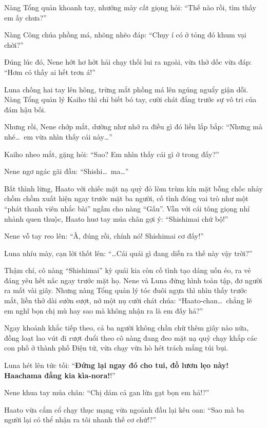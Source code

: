 \documentclass[../main.tex]{subfiles}
\begin{document}

Nàng Tổng quản khoanh tay, nhướng mày cất giọng hỏi: ``Thế nào rồi, tìm thấy em ấy chưa?''

Nàng Công chúa phồng má, nhõng nhẽo đáp: ``Chụy í có ở tỏng đó khum vại chời?''

Đúng lúc đó, Nene hớt hơ hớt hải chạy thối lui ra ngoài, vừa thở dốc vừa đáp: ``Hơm có thấy ai hết trơn á!''

Luna chống hai tay lên hông, trừng mắt phồng má lên ngúng nguẩy giận dỗi. Nàng Tổng quản lý Kaiho thì chỉ biết bó tay, cười chát đắng trước sự vô tri của đám hậu bối.

Nhưng rồi, Nene chớp mắt, dường như nhớ ra điều gì đó liền lắp bắp: ``Nhưng mà nhé\dots\ em vừa nhìn thấy cái này\dots''

Kaiho nheo mắt, gặng hỏi: ``Sao? Em nhìn thấy cái gì ở trong đấy?''

Nene ngơ ngác gãi đầu: ``Shishi\dots\ ma\dots''

Bất thình lừng, Haato với chiếc mặt nạ quỷ đỏ lòm trùm kín mặt bỗng chốc nhảy chồm chồm xuất hiện ngay trước mặt ba người, cố tình đóng vai trò như một ``phát thanh viên nhắc bài'' ngầm cho nàng ``Gấu''. Vẫn với cái tông giọng nhí nhảnh quen thuộc, Haato huơ tay múa chân gợi ý: ``Shishimai chứ bộ!''


Nene vỗ tay reo lên: ``À, đúng rồi, chính nó! Shishimai cơ đấy!''

Luna nhíu mày, cạn lời thốt lên: ``\dots Cái quái gì đang diễn ra thế này vậy trời?''

Thậm chí, cô nàng ``Shishimai'' kỳ quái kia còn cố tình tạo dáng uốn éo, ra vẻ đáng yêu hết nấc ngay trước mặt họ. Nene và Luna đứng hình toàn tập, đơ người ra mất vài giây. Nhưng nàng Tổng quản lý tóc đuôi ngựa thì nhìn thấy trước mắt, liền thở dài sườn sượt, nở một nụ cười chát chúa: ``Haato-chan\dots\ chẳng lẽ em nghĩ bọn chị mù hay sao mà không nhận ra là em đấy hả?''

Ngay khoảnh khắc tiếp theo, cả ba người không chần chừ thêm giây nào nữa, đồng loạt lao vút đi rượt đuổi theo cô nàng đang đeo mặt nạ quỷ chạy khắp các con phố ở thành phố Điện tử, vừa chạy vừa hò hét trách mắng túi bụi.

Luna hét lên tức tối: ``\textbf{Đứng lại ngay đó cho tui, đồ lươn lẹo này! Haachama đằng kia kìa-nora!}!''

Nene khua tay múa chân: ``Chị dám cả gan lừa gạt bọn em hả!?''

Haato vừa cắm cổ chạy thục mạng vừa ngoảnh đầu lại kêu oan: ``Sao mà ba người lại có thể nhận ra tôi nhanh thế cơ chứ!?''
\end{document}
